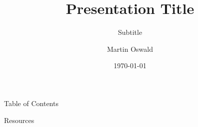 \documentclass[
10pt, 
xcolor=x11names,
aspectratio=169,
notes
]{beamer}
\title{Presentation Title}
\subtitle{Subtitle}
\author{Martin Oswald}
\date{\today}
\begin{document}
\frame[plain]{\titlepage}

\begin{frame}{Table of Contents}
\tableofcontents
\end{frame}




\begin{frame}[allowframebreaks]{Resources}
\printbibliography
\end{frame}

\end{document}
